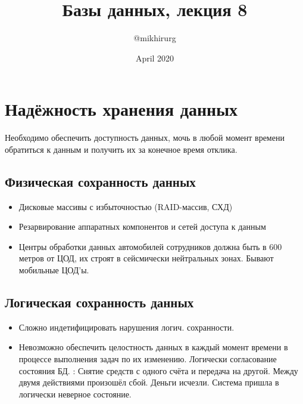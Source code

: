 \documentclass{article}
\title{Базы данных, лекция 8}
\author{@mikhirurg}
\date{April 2020}
\begin{document}
\maketitle

\section{Надёжность хранения данных}

Необходимо обеспечить доступность данных, мочь в любой момент времени обратиться к данным и получить их за конечное время отклика.

\subsection{Физическая сохранность данных}

\begin{itemize}
    \item Дисковые массивы с избыточностью (RAID-массив, СХД)
    \item Резарвирование аппаратных компонентов и сетей доступа к данным
    \item Центры обработки данных
     автомобилей сотрудников должна быть в 600 метров от ЦОД, их строят в сейсмически нейтральных зонах.
    Бывают мобильные ЦОД'ы.
\end{itemize}

\subsection{Логическая сохранность данных}
\begin{itemize}
    \item Сложно индетифицировать нарушения логич. сохранности. 
    \item Невозможно обеспечить целостность данных в каждый момент времени в процессе выполнения задач по их изменению. Логически согласование состояния БД.
    : Снятие средств с одного счёта и передача на другой. Между двумя действиями произошёл сбой. Деньги исчезли. Система пришла в логически неверное состояние.
\end{itemize}

\newpage
\end{document}

